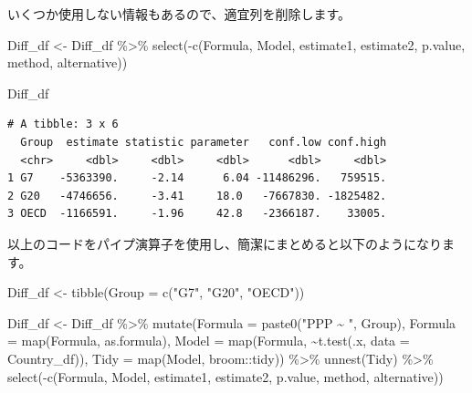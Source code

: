 \documentclass[
  a4paper,
  pandoc,
  ja=standard,
  jafont=haranoaji]{bxjsbook}
\newenvironment{Shaded}{\begin{snugshade}}{\end{snugshade}}
\newcommand{\AttributeTok}[1]{\textcolor[rgb]{0.00,0.48,0.65}{#1}}
\newcommand{\FunctionTok}[1]{\textcolor[rgb]{0.28,0.35,0.67}{#1}}
\newcommand{\NormalTok}[1]{\textcolor[rgb]{0.00,0.48,0.65}{#1}}
\newcommand{\OtherTok}[1]{\textcolor[rgb]{0.00,0.48,0.65}{#1}}
\newcommand{\SpecialCharTok}[1]{\textcolor[rgb]{0.37,0.37,0.37}{#1}}
\newcommand{\StringTok}[1]{\textcolor[rgb]{0.13,0.47,0.30}{#1}}
\begin{document}
いくつか使用しない情報もあるので、適宜列を削除します。

\begin{Shaded}
\begin{Highlighting}[numbers=left,,]
\NormalTok{Diff\_df }\OtherTok{\textless{}{-}}\NormalTok{ Diff\_df }\SpecialCharTok{\%\textgreater{}\%}
  \FunctionTok{select}\NormalTok{(}\SpecialCharTok{{-}}\FunctionTok{c}\NormalTok{(Formula, Model, estimate1, estimate2, }
\NormalTok{            p.value, method, alternative))}

\NormalTok{Diff\_df}
\end{Highlighting}
\end{Shaded}

\begin{verbatim}
# A tibble: 3 x 6
  Group  estimate statistic parameter   conf.low conf.high
  <chr>     <dbl>     <dbl>     <dbl>      <dbl>     <dbl>
1 G7    -5363390.     -2.14      6.04 -11486296.   759515.
2 G20   -4746656.     -3.41     18.0   -7667830. -1825482.
3 OECD  -1166591.     -1.96     42.8   -2366187.    33005.
\end{verbatim}

以上のコードをパイプ演算子を使用し、簡潔にまとめると以下のようになります。

\begin{Shaded}
\begin{Highlighting}[numbers=left,,]
\NormalTok{Diff\_df }\OtherTok{\textless{}{-}} \FunctionTok{tibble}\NormalTok{(}\AttributeTok{Group =} \FunctionTok{c}\NormalTok{(}\StringTok{"G7"}\NormalTok{, }\StringTok{"G20"}\NormalTok{, }\StringTok{"OECD"}\NormalTok{))}

\NormalTok{Diff\_df }\OtherTok{\textless{}{-}}\NormalTok{ Diff\_df }\SpecialCharTok{\%\textgreater{}\%}
  \FunctionTok{mutate}\NormalTok{(}\AttributeTok{Formula =} \FunctionTok{paste0}\NormalTok{(}\StringTok{"PPP \textasciitilde{} "}\NormalTok{, Group),}
         \AttributeTok{Formula =} \FunctionTok{map}\NormalTok{(Formula, as.formula),}
         \AttributeTok{Model   =} \FunctionTok{map}\NormalTok{(Formula, }\SpecialCharTok{\textasciitilde{}}\FunctionTok{t.test}\NormalTok{(.x, }\AttributeTok{data =}\NormalTok{ Country\_df)),}
         \AttributeTok{Tidy    =} \FunctionTok{map}\NormalTok{(Model, broom}\SpecialCharTok{::}\NormalTok{tidy)) }\SpecialCharTok{\%\textgreater{}\%}
  \FunctionTok{unnest}\NormalTok{(Tidy) }\SpecialCharTok{\%\textgreater{}\%}
  \FunctionTok{select}\NormalTok{(}\SpecialCharTok{{-}}\FunctionTok{c}\NormalTok{(Formula, Model, estimate1, estimate2, }
\NormalTok{            p.value, method, alternative))}
\end{Highlighting}
\end{Shaded}
\end{document}
